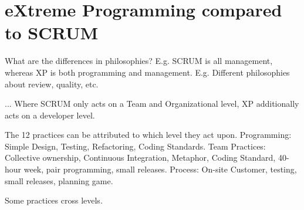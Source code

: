 \section{eXtreme Programming compared to SCRUM}
What are the differences in philosophies?
E.g. SCRUM is all management, whereas XP is both programming and management.
E.g. Different philosophies about review, quality, etc.






...
Where SCRUM only acts on a Team and Organizational level, XP additionally acts on a developer level.


The 12 practices can be attributed to which level they act upon.
Programming: Simple Design, Testing, Refactoring, Coding Standards.
Team Practices: Collective ownership, Continuous Integration, Metaphor, Coding Standard, 40-hour week, pair programming, small releases.
Process: On-site Customer, testing, small releases, planning game.

Some practices cross levels.
